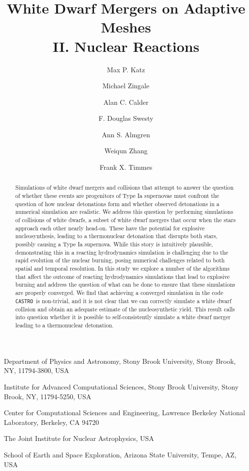 \documentclass[twocolumn,numberedappendix]{../aastex6}
\newcommand{\castro}{\texttt{CASTRO}}
\begin{document}
\title{White Dwarf Mergers on Adaptive Meshes\\ II. Nuclear Reactions}


\author{Max P. Katz}
\author{Michael Zingale}
\author{Alan C. Calder}
\author{F. Douglas Swesty}
\author{Ann S. Almgren}
\author{Weiqun Zhang}
\author{Frank X. Timmes}

{
  Department of Physics and Astronomy,
  Stony Brook University, Stony Brook, NY, 11794-3800, USA
}

{
  Institute for Advanced Computational Sciences,
  Stony Brook University, Stony Brook, NY, 11794-5250, USA
}

{
  Center for Computational Sciences and Engineering,
  Lawrence Berkeley National Laboratory, Berkeley, CA 94720
}

{
  The Joint Institute for Nuclear Astrophysics, USA
}

{
  School of Earth and Space Exploration, Arizona State University, Tempe, AZ, USA
}



\begin{abstract}
Simulations of white dwarf mergers and collisions that attempt to answer the
question of whether these events are progenitors of Type Ia supernovae must
confront the question of how nuclear detonations form and whether observed
detonations in a numerical simulation are realistic. We address this question
by performing simulations of collisions of white dwarfs, a subset of white
dwarf mergers that occur when the stars approach each other nearly head-on.
These have the potential for explosive nucleosynthesis, leading to a thermonuclear
detonation that disrupts both stars, possibly causing a Type Ia supernova.
While this story is intuitively plausible, demonstrating this in a reacting
hydrodynamics simulation is challenging due to the rapid evolution of the
nuclear burning, posing numerical challenges related to both spatial and
temporal resolution. In this study we explore a number of the algorithms
that affect the outcome of reacting hydrodynamics simulations that lead
to explosive burning and address the question of what can be done to ensure
that these simulations are properly converged. We find that achieving a
converged simulation in the code \castro\ is non-trivial, and it is not
clear that we can correctly simulate a white dwarf collision and obtain
an adequate estimate of the nucleosynthetic yield. This result calls into
question whether it is possible to self-consistently simulate a white dwarf
merger leading to a thermonuclear detonation.
\end{abstract}
\end{document}
